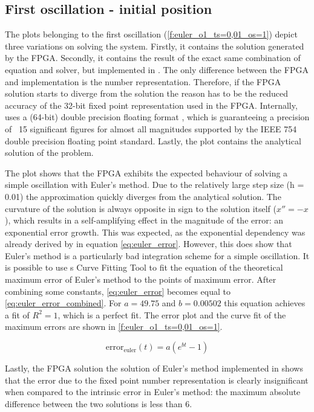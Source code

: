 \subsection{First oscillation - initial position}
The plots belonging to the first oscillation (\ref{f:euler_o1_ts=0,01_os=1}) depict three variations on solving the system. Firstly, it contains the solution generated by the FPGA. Secondly, it contains the result of the exact same combination of equation and solver, but implemented in \matlab{}. The only difference between the FPGA and \matlab{} implementation is the number representation. Therefore, if the FPGA solution starts to diverge from the \matlab{} solution the reason has to be the reduced accuracy of the 32-bit fixed point representation used in the FPGA. Internally, \matlab{} uses a (64-bit) double precision floating format \cite{MatlabFloat}, which is guaranteeing a precision of ~15 significant figures for almost all magnitudes supported by the IEEE 754 double precision floating point standard. Lastly, the plot contains the analytical solution of the problem.

The plot shows that the FPGA exhibits the expected behaviour of solving a simple oscillation with Euler's method. Due to the relatively large step size (h = 0.01) the approximation quickly diverges from the analytical solution. The curvature of the solution is always opposite in sign to the solution itself ($x'' = -x$), which results in a self-amplifying effect in the magnitude of the error: an exponential error growth. This was expected, as the exponential dependency was already derived by \cite{DE} in equation \ref{eq:euler_error}. However, this does show that Euler's method is a particularly bad integration scheme for a simple oscillation. It is possible to use \matlab{}s Curve Fitting Tool to fit the equation of the theoretical maximum error of Euler's method to the points of maximum error. After combining some constants, \ref{eq:euler_error} becomes equal to \ref{eq:euler_error_combined}. For $a = 49.75$ and $b = 0.00502$ this equation achieves a fit of $R^{2} = 1$, which is a perfect fit. The error plot and the curve fit of the maximum errors are shown in \ref{f:euler_o1_ts=0,01_os=1}.

\begin{equation}
\label{eq:euler_error_combined}
\text{error}_{\text{euler}}(t) = a (e^{b t} - 1)
\end{equation}

Lastly, the FPGA solution the solution of Euler's method implemented in \matlab{} shows that the error due to the fixed point number representation is clearly insignificant when compared to the intrinsic error in Euler's method: the maximum absolute difference between the two solutions is less than 6.

